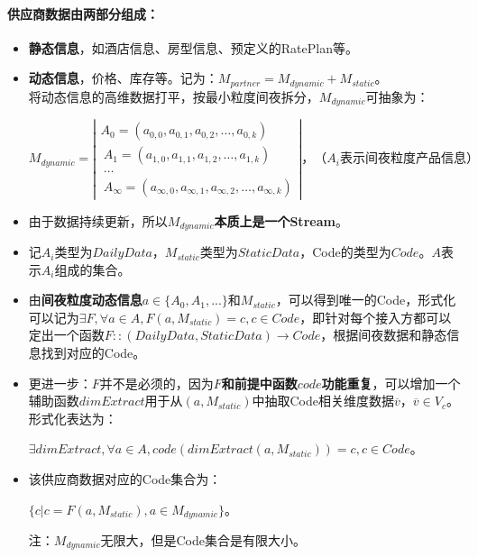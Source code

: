 \documentclass[a4paper]{article}
\begin{document}
\paragraph{供应商数据由两部分组成：}
\begin{itemize}
    \item \textbf{静态信息}，如酒店信息、房型信息、预定义的RatePlan等。
    \item \textbf{动态信息}，价格、库存等。记为：$M_{partner}=M_{dynamic}+M_{static}$。\\
    将动态信息的高维数据打平，按最小粒度间夜拆分，$M_{dynamic}$可抽象为：
    \begin{center}
    $M_{dynamic}=\left|\begin{array}{ccc}
    A_0=(a_{0,0},a_{0,1},a_{0,2}, \dots, a_{0,k}) \\\
    A_1=(a_{1,0},a_{1,1},a_{1,2}, \dots, a_{1,k}) \\\
    \dots \\\
    A_{\infty}=(a_{\infty,0},a_{\infty,1},a_{\infty,2},\dots,a_{\infty,k}) 
    \end{array} \right|，（A_i表示间夜粒度产品信息）$
    \end{center}
    \item 由于数据持续更新，所以\textbf{$M_{dynamic}$本质上是一个Stream}。
    \item 记$A_i$类型为$DailyData$，$M_{static}$类型为$StaticData$，Code的类型为$Code$。$A$表示$A_i$组成的集合。
    \item 由\textbf{间夜粒度动态信息}$a\in \{A_0,A_1,...\}$和$M_{static}$，可以得到唯一的Code，形式化可以记为$\exists F,  \forall a \in A, F(a,M_{static}) = c ,  c\in Code$，即针对每个接入方都可以定出一个函数$F::(DailyData, StaticData) \to Code$，根据间夜数据和静态信息找到对应的Code。
    \item 更进一步：$F$并不是必须的，因为\textbf{$F$和前提中函数$code$功能重复}，可以增加一个辅助函数$dimExtract$用于从$(a, M_{static})$中抽取Code相关维度数据$\overline v，\overline v \in V_c$。形式化表达为：
    \begin{center}
        $\exists dimExtract,  \forall a \in A, code(dimExtract(a,M_{static})) = c ,  c\in Code$。
    \end{center}
    \item 该供应商数据对应的Code集合为：
    \begin{center}
        $\{ c | c = F(a, M_{static}), a \in M_{dynamic}\}$。
    \end{center}
    注：$M_{dynamic}$无限大，但是Code集合是有限大小。
\end{itemize}
\end{document}
